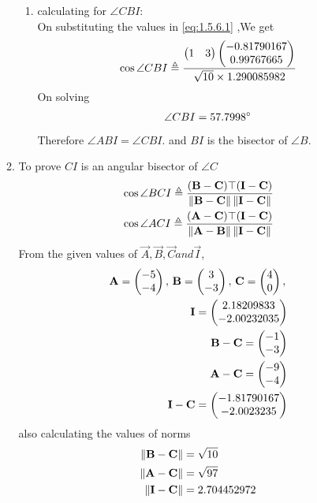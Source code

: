 \documentclass[10pt]{book}
\begin{document}
\begin{enumerate}[label=\thesection.\arabic*.,ref=\thesection.\theenumi]
\begin{enumerate}
\begin{enumerate}[label=(\alph*)]
       \item calculating for $\angle CBI$: \\
    On substituting the values in  \eqref{eq:1.5.6.1} ,We get 
    \begin{align}
        \cos{\angle CBI} \triangleq \frac{\begin{pmatrix} 1 & 3\end{pmatrix}\begin{pmatrix} -0.81790167 \\ 0.99767665\end{pmatrix}}{ \sqrt{10} \times 1.290085982} \\
    \end{align}
    On solving 
    \begin{align}
        \angle CBI = 57.7998\degree
    \end{align}
    Therefore $\angle ABI = \angle CBI.$ and $BI$ is the bisector of $\angle B$. 
\end{enumerate}


    \item To prove $CI$ is an angular bisector of $ \angle C$
\begin{align}
\label{eq:1.5.6.18}
\cos{\angle BCI} \triangleq \frac{(\vec{B}-\vec{C})\top(\vec{I}-\vec{C})}{\norm{\vec{B}-\vec{C}}\norm{\vec{I}-\vec{C}}} \\
\cos{\angle ACI} \triangleq \frac{(\vec{A}-\vec{C})\top(\vec{I}-\vec{C})}{\norm{\vec{A}-\vec{B}}\norm{\vec{I}-\vec{C}}} 
\end{align}
From the given values of $\vec{A},\vec{B},\vec{C} and \vec{I}$,\\
\begin{align}
    \mathbf{A}=\begin{pmatrix}-5 \\ -4\end{pmatrix},\,
    \mathbf{B}=\begin{pmatrix}3\\-3\end{pmatrix},\,
    \mathbf{C}=\begin{pmatrix}4\\0\end{pmatrix},\, \\
    \mathbf{I}=\begin{pmatrix}2.18209833 \\ -2.00232035\end{pmatrix}\\
    \mathbf{B}-\mathbf{C} =\begin{pmatrix}-1\\-3\end{pmatrix} \\
    \mathbf{A}-\mathbf{C} = \begin{pmatrix}-9\\-4\end{pmatrix} \\
    \mathbf{I}-\mathbf{C} =\begin{pmatrix}-1.81790167 \\ -2.0023235\end{pmatrix}
\end{align}
also calculating the values of norms
\begin{align}
	\left\lVert\mathbf{B}-\mathbf{C}\right\rVert &= \sqrt{10} \\
	\left\lVert\mathbf{A}-\mathbf{C}\right\rVert &= \sqrt{97} \\
 	\left\lVert\mathbf{I}-\mathbf{C}\right\rVert &= 2.704452972 \\
\end{align}


\end{enumerate}
\end{enumerate}
\end{document}

